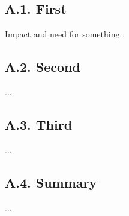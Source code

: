 \subsection{A.1. First}

Impact and need for something \cite{article}.

\subsection{A.2. Second}

... 

\subsection{A.3. Third}

... 

\subsection{A.4. Summary}

... 

